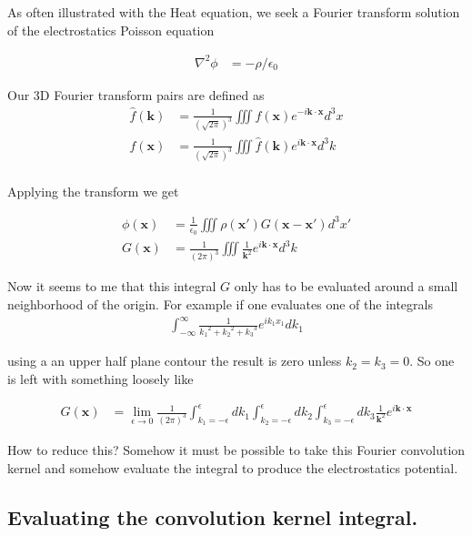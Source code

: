 As often illustrated with the Heat equation, we seek a Fourier transform solution of the electrostatics Poisson equation

\begin{align}
\nabla^2 \phi &= -\rho/\epsilon_0
\end{align}

Our 3D Fourier transform pairs are defined as
\begin{align*}
\hat{f}(\mathbf{k}) &= \frac{1}{(\sqrt{2\pi})^3} \iiint f(\mathbf{x}) e^{-i \mathbf{k} \cdot \mathbf{x} } d^3 x \\
{f}(\mathbf{x}) &= \frac{1}{(\sqrt{2\pi})^3} \iiint \hat{f}(\mathbf{k}) e^{i \mathbf{k} \cdot \mathbf{x} } d^3 k \\
\end{align*}

Applying the transform we get

\begin{align}\label{eqn:poisson:poissonSolution}
\phi(\mathbf{x}) &= \frac{1}{\epsilon_0} \iiint \rho(\mathbf{x}') G(\mathbf{x-x'}) d^3 x' \\
G(\mathbf{x}) &= \frac{1}{(2 \pi)^3} \iiint \frac{1}{\mathbf{k}^2} e^{ i \mathbf{k} \cdot \mathbf{x} } d^3 k
\end{align}

Now it seems to me that this integral $G$ only has to be evaluated around a small neighborhood of the origin.  For example if one evaluates one of
the
integrals
\begin{align*}
\int_{-\infty}^\infty \frac{1}{{k_1}^2 + {k_2}^2 + {k_3}^3 } e^{ i k_1 x_1 } dk_1
\end{align*}

using a an upper half plane contour the result is zero unless $k_2 = k_3 = 0$.  So one is left with something loosely like

\begin{align*}
G(\mathbf{x}) &= \lim_{\epsilon \rightarrow 0} \frac{1}{(2 \pi)^3}
\int_{k_1 = -\epsilon}^{\epsilon} dk_1
\int_{k_2 = -\epsilon}^{\epsilon} dk_2
\int_{k_3 = -\epsilon}^{\epsilon} dk_3
 \frac{1}{\mathbf{k}^2} e^{ i \mathbf{k} \cdot \mathbf{x} }
\end{align*}

How to reduce this?  Somehow it must be possible to take this Fourier convolution kernel and somehow evaluate the integral to produce the
electrostatics potential.

\subsection{Evaluating the convolution kernel integral. }

